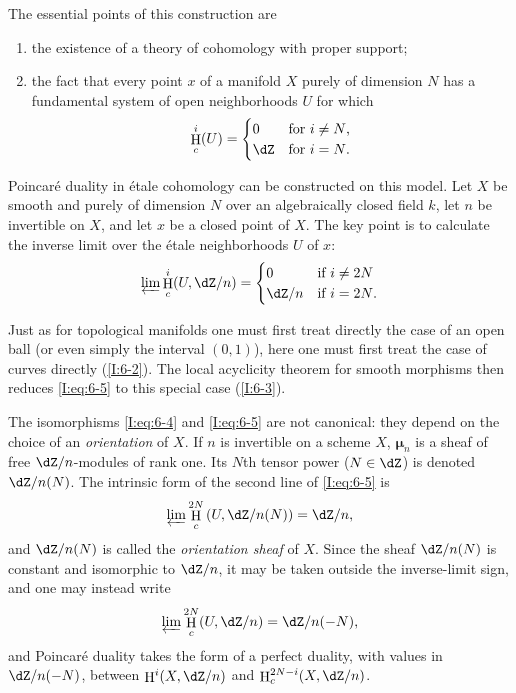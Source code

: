 \documentclass[12pt,oneside,english]{smfbook}
\DeclareMathOperator{\h}{H}
\newcommand{\dmu}{{\bm\mu}}
\begin{document}
The essential points of this construction are
\begin{enumerate}[\indent a)]
  \item the existence of a theory of cohomology with proper support;
  \item the fact that every point $x$ of a manifold $X$ purely of dimension $N$ has a fundamental system of open neighborhoods $U$ for which
    \begin{equation}\label{I:eq:6-4}
      \h_c^i(U) = \begin{cases}
                    0   & \text{for $i\ne N$,} \\
                    \dZ & \text{for $i=N$.}
                  \end{cases}
    \end{equation}
\end{enumerate}

Poincaré duality in étale cohomology can be constructed on this model. Let $X$ be smooth and purely of dimension $N$ over an algebraically closed field $k$, let $n$ be invertible on $X$, and let $x$ be a closed point of $X$. The key point is to calculate the inverse limit over the étale neighborhoods $U$ of $x$:
\begin{equation}\label{I:eq:6-5}
  \varprojlim \h_c^i(U,\dZ/n)
    = \begin{cases}
        0     & \text{if $i\ne 2N$} \\
        \dZ/n & \text{if $i=2N$.}
      \end{cases}
\end{equation}

Just as for topological manifolds one must first treat directly the case of an open ball (or even simply the interval $(0,1)$), here one must first treat the case of curves directly (\ref{I:6-2}). The local acyclicity theorem for smooth morphisms then reduces \eqref{I:eq:6-5} to this special case (\ref{I:6-3}).

The isomorphisms \eqref{I:eq:6-4} and \eqref{I:eq:6-5} are not canonical: they depend on the choice of an \emph{orientation} of $X$. If $n$ is invertible on a scheme $X$, $\dmu_n$ is a sheaf of free $\dZ/n$-modules of rank one. Its $N$th tensor power ($N\in\dZ$) is denoted $\dZ/n(N)$. The intrinsic form of the second line of \eqref{I:eq:6-5} is
\begin{equation}\label{I:eq:6-5'}
  \varprojlim \h_c^{2N} \left(U,\dZ/n(N)\right) = \dZ/n \text{,}
\end{equation}
and $\dZ/n(N)$ is called the \emph{orientation sheaf} of $X$. Since the sheaf $\dZ/n(N)$ is constant and isomorphic to $\dZ/n$, it may be taken outside the inverse-limit sign, and one may instead write
\begin{equation}\label{I:eq:6-5''}
  \varprojlim \h_c^{2N} (U,\dZ/n) = \dZ/n(-N) \text{,}
\end{equation}
and Poincaré duality takes the form of a perfect duality, with values in $\dZ/n(-N)$, between $\h^i(X,\dZ/n)$ and $\h_c^{2N-i}(X,\dZ/n)$.
\end{document}
